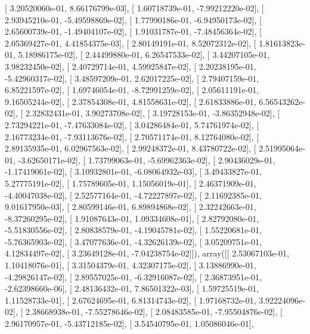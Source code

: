 \documentclass{article}
\begin{document}
       [  3.20520060e-01,   8.66176799e-03],
       [  1.60718739e-01,  -7.99212220e-02],
       [  2.93945210e-01,  -5.49598869e-02],
       [  1.77990186e-01,  -6.94950173e-02],
       [  2.65600739e-01,  -1.49404107e-02],
       [  1.91031787e-01,  -7.48456364e-02],
       [  2.05369427e-01,   4.41854375e-03],
       [  2.80149191e-01,   8.52072312e-02],
       [  1.81613823e-01,   5.18986175e-02],
       [  2.44499880e-01,   6.26547533e-02],
       [  3.44207105e-01,   3.98232450e-02],
       [  2.40729714e-01,   4.59925847e-02],
       [  2.20238195e-01,  -5.42960317e-02],
       [  3.48597209e-01,   2.62017225e-02],
       [  2.79407159e-01,   6.85221597e-02],
       [  1.69746054e-01,  -8.72991259e-02],
       [  2.05611191e-01,   9.16505244e-02],
       [  2.37854308e-01,   4.81558631e-02],
       [  2.61833886e-01,   6.56543262e-02],
       [  2.32832431e-01,   3.90273708e-02],
       [  3.19728153e-01,  -3.86352948e-02],
       [  2.73294221e-01,  -7.47633084e-02],
       [  3.04286484e-01,   5.74761974e-02],
       [  2.16773234e-01,  -7.93113676e-02],
       [  2.70571174e-01,   8.12764080e-02],
       [  2.89135935e-01,   6.02967563e-02],
       [  2.99248372e-01,   8.43780722e-02],
       [  2.51995064e-01,  -3.62650171e-02],
       [  1.73799063e-01,  -5.69962363e-02],
       [  2.90436029e-01,  -1.17419061e-02],
       [  3.10932801e-01,  -6.08064932e-03],
       [  3.49433827e-01,   5.27775191e-02],
       [  1.75789605e-01,   1.15056019e-01],
       [  2.46371909e-01,  -4.40047038e-02],
       [  2.52577164e-01,  -4.72227897e-02],
       [  2.11692385e-01,   9.01617950e-03],
       [  2.80599146e-01,   6.89894868e-02],
       [  2.32242663e-01,  -8.37260295e-02],
       [  1.91087643e-01,   1.09334608e-01],
       [  2.82792080e-01,  -5.51830556e-02],
       [  2.80838579e-01,  -4.19045781e-02],
       [  1.55220681e-01,  -5.76365903e-02],
       [  3.47077636e-01,  -4.32626139e-02],
       [  3.05209751e-01,   4.12834497e-02],
       [  3.23649128e-01,  -7.04238754e-02]]), array([[  2.53067103e-01,   1.10418076e-01],
       [  3.31504379e-01,   4.32307175e-02],
       [  3.13886990e-01,  -4.29826147e-02],
       [  2.89557025e-01,  -6.32916087e-02],
       [  2.36873951e-01,  -2.62398660e-06],
       [  2.48136432e-01,   7.86501322e-03],
       [  1.59725519e-01,   1.11528733e-01],
       [  2.67624695e-01,   6.81314743e-02],
       [  1.97168732e-01,   3.92224096e-02],
       [  2.38668938e-01,  -7.55278646e-02],
       [  2.08483585e-01,  -7.95504876e-02],
       [  2.96170957e-01,  -5.43712185e-02],
       [  3.54540795e-01,   1.05086046e-01],
\end{document}
